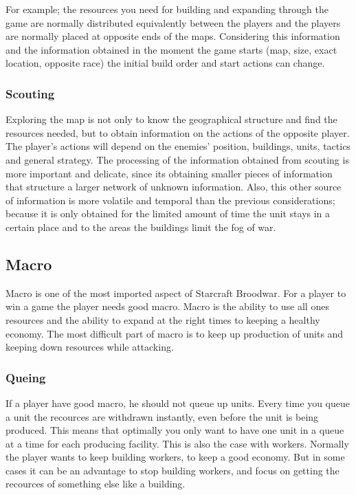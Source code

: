 				For example; the resources you need for building and expanding through the game are normally distributed
				equivalently between the players and the players are normally placed at opposite ends of the maps. 
				Considering this information and the information obtained in the moment the game starts 
				(map, size, exact location, opposite race) the initial build order and start actions can change. 
		
			\subsubsection{Scouting}
				Exploring the map is not only to know the geographical structure and find the resources needed, 
				but to obtain information on the actions of the opposite player. The player's actions will depend on
				the enemies' position, buildings, units, tactics and general strategy. The processing of the information 
				obtained from scouting is more important and delicate, since its obtaining smaller pieces of information 
				that structure a larger network of unknown information. Also, this other source of information 
				is more volatile and temporal than the previous considerations; because it is only obtained for the 
				limited amount of time the unit stays in a certain place and to the areas the buildings limit the fog of war.
				
	\subsection{Macro}
		Macro is one of the most imported aspect of Starcraft Broodwar. For a player to win a game the player needs good macro. 
		Macro is the ability to use all ones resources and the ability to expand at the right times to keeping a healthy economy.
		The most difficult part of macro is to keep up production of units and keeping down resources while attacking.  
			
			\subsubsection{Queing}
				If a player have good macro, he should not queue up units. 
				Every time you queue a unit the recources are withdrawn instantly, even before 
				the unit is being produced. This means that optimally you only want to have one unit in a queue at a time for each producing facility.
				This is also the case with workers. Normally the player wants to keep building workers, to keep a good economy.
				But in some cases it can be an advantage to stop building workers, and focus on getting the recources of something else like a building.
				
